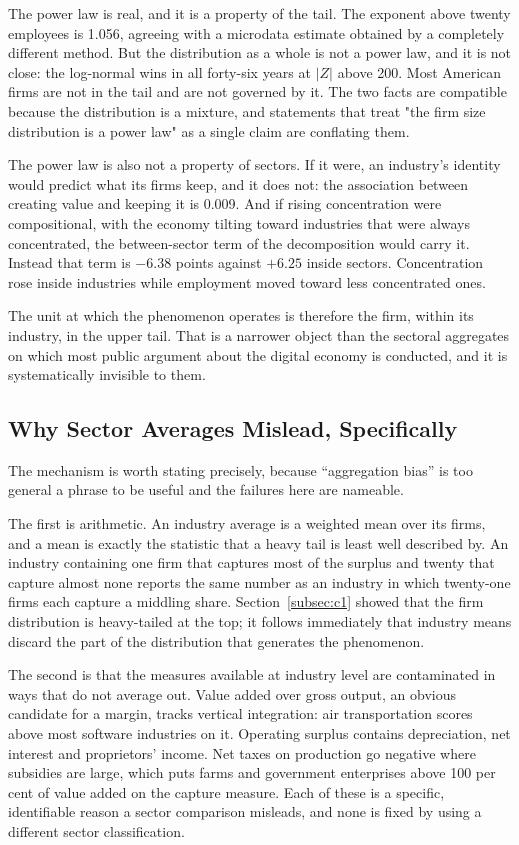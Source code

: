 \documentclass[jrfm,article,submit,pdftex,moreauthors]{Definitions/mdpi}
\begin{document}
The power law is real, and it is a property of the tail. The exponent above twenty employees
is 1.056, agreeing with a microdata estimate obtained by a completely different method. But
the distribution as a whole is not a power law, and it is not close: the log-normal wins in
all forty-six years at $|Z|$ above 200. Most American firms are not in the tail and are not
governed by it. The two facts are compatible because the distribution is a mixture, and
statements that treat "the firm size distribution is a power law" as a single claim are
conflating them.

The power law is also not a property of sectors. If it were, an industry's identity would
predict what its firms keep, and it does not: the association between creating value and
keeping it is 0.009. And if rising concentration were compositional, with the economy
tilting toward industries that were always concentrated, the between-sector term of the
decomposition would carry it. Instead that term is $-6.38$ points against $+6.25$ inside
sectors. Concentration rose inside industries while employment moved toward less
concentrated ones.

The unit at which the phenomenon operates is therefore the firm, within its industry, in the
upper tail. That is a narrower object than the sectoral aggregates on which most public
argument about the digital economy is conducted, and it is systematically invisible to them.

\subsection{Why Sector Averages Mislead, Specifically}
\label{subsec:unit}

The mechanism is worth stating precisely, because ``aggregation bias'' is too general a
phrase to be useful and the failures here are nameable.

The first is arithmetic. An industry average is a weighted mean over its firms, and a mean
is exactly the statistic that a heavy tail is least well described by. An industry
containing one firm that captures most of the surplus and twenty that capture almost none
reports the same number as an industry in which twenty-one firms each capture a middling
share. Section~\ref{subsec:c1} showed that the firm distribution is heavy-tailed at the top;
it follows immediately that industry means discard the part of the distribution that
generates the phenomenon.

The second is that the measures available at industry level are contaminated in ways that do
not average out. Value added over gross output, an obvious candidate for a margin, tracks
vertical integration: air transportation scores above most software industries on it.
Operating surplus contains depreciation, net interest and proprietors' income. Net taxes on
production go negative where subsidies are large, which puts farms and government
enterprises above 100 per cent of value added on the capture measure. Each of these is a
specific, identifiable reason a sector comparison misleads, and none is fixed by using a
different sector classification.
\end{document}
